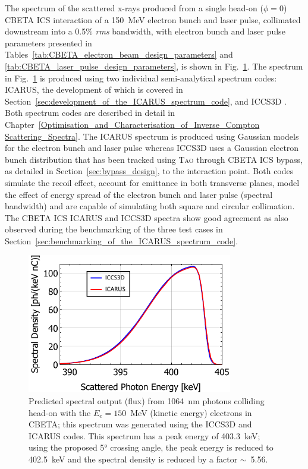 \documentclass[../main.tex]{subfiles}
\begin{document}
The spectrum of the scattered x-rays produced from a single head-on ($\phi = 0$) CBETA ICS interaction of a 150~\si{\mega\electronvolt} electron bunch and laser pulse, collimated downstream into a 0.5\% \textit{rms} bandwidth, with electron bunch and laser pulse parameters presented in Tables~\ref{tab:CBETA_electron_beam_design_parameters} and \ref{tab:CBETA_laser_pulse_design_parameters}, is shown in Fig.~\ref{fig:CBETA_spectrum_benchmarking}. The spectrum in Fig.~\ref{fig:CBETA_spectrum_benchmarking} is produced using two individual semi-analytical spectrum codes: \textsc{ICARUS}, the development of which is covered in Section~\ref{sec:development_of_the_ICARUS_spectrum_code}, and \textsc{ICCS3D} \cite{krafft2016laser,ranjan2018simulation}. Both spectrum codes are described in detail in Chapter~\ref{Optimisation_and_Characterisation_of_Inverse_Compton Scattering_Spectra}. The \textsc{ICARUS} spectrum is produced using Gaussian models for the electron bunch and laser pulse whereas \textsc{ICCS3D} uses a Gaussian electron bunch distribution that has been tracked using \textsc{Tao} \cite{TaoManual} through CBETA ICS bypass, as detailed in Section~\ref{sec:bypass_design}, to the interaction point. Both codes simulate the recoil effect, account for emittance in both transverse planes, model the effect of energy spread of the electron bunch and laser pulse (spectral bandwidth) and are capable of simulating both square and circular collimation. The CBETA ICS \textsc{ICARUS} and \textsc{ICCS3D} spectra show good agreement as also observed during the benchmarking of the three test cases in Section~\ref{sec:benchmarking_of_the_ICARUS_spectrum_code}.
\begin{figure}[!h]
\centering
\includegraphics[width=0.8\textwidth]{Figures/CBETA_Inverse_Compton_Source_Design/CBETA150_spectrum_FINAL.pdf}
\caption{Predicted spectral output (flux) from 1064~\si{\nano\meter} photons colliding head-on with the $E_e =150$~\si{\mega\electronvolt} (kinetic energy) electrons in CBETA; this spectrum was generated using the \textsc{ICCS3D} and \textsc{ICARUS} codes. This spectrum has a peak energy of 403.3~\si{\kilo\electronvolt}; using the proposed 5\si{\degree} crossing angle, the peak energy is reduced to 402.5~\si{\kilo\electronvolt} and the spectral density is reduced by a factor $\sim$~5.56.}
\label{fig:CBETA_spectrum_benchmarking}
\end{figure}
\end{document}
